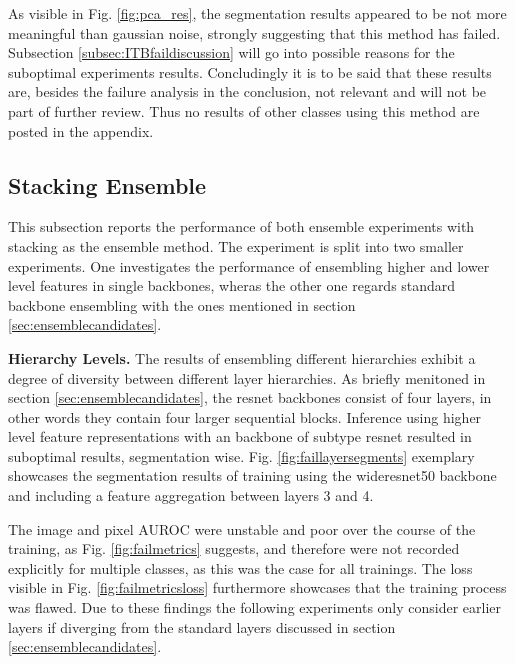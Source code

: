 As visible in Fig. \ref{fig:pca_res}, the segmentation results appeared to be not more meaningful than gaussian noise, strongly suggesting that this method has failed. Subsection 
\ref{subsec:ITBfaildiscussion} will go into possible reasons for the suboptimal experiments results. Concludingly it is to be said that these results are, besides the failure analysis 
in the conclusion, not relevant and will not be part of further review. Thus no results of other classes using this method are posted in the appendix.

\subsection{Stacking Ensemble}
\label{subsec:stacking}
This subsection reports the performance of both ensemble experiments with stacking as the ensemble method. 
The experiment is split into two smaller experiments. One investigates the performance of ensembling higher and lower level features in 
single backbones, wheras the other one regards standard backbone ensembling with the ones mentioned in section \ref{sec:ensemblecandidates}. 






\textbf{Hierarchy Levels.} The results of ensembling different hierarchies exhibit a degree of diversity between different layer hierarchies. As briefly menitoned in section \ref{sec:ensemblecandidates}, the resnet backbones consist of four 
layers, in other words they contain four larger sequential blocks. Inference using higher level feature representations with an backbone of subtype resnet resulted in suboptimal results, segmentation wise. 
Fig. \ref{fig:faillayersegments} exemplary showcases the segmentation results of training using the wideresnet50 backbone and including a feature aggregation between layers 3 and 4. 



The image and pixel AUROC were unstable and poor over the course of the training, 
as Fig. \ref{fig:failmetrics} suggests, and therefore were not recorded explicitly for multiple classes, as this was the case for all trainings. The loss visible in Fig. \ref{fig:failmetricsloss} furthermore 
showcases that the training process was flawed. Due to these findings the following experiments only consider earlier layers if diverging from the standard layers 
discussed in section \ref{sec:ensemblecandidates}.

